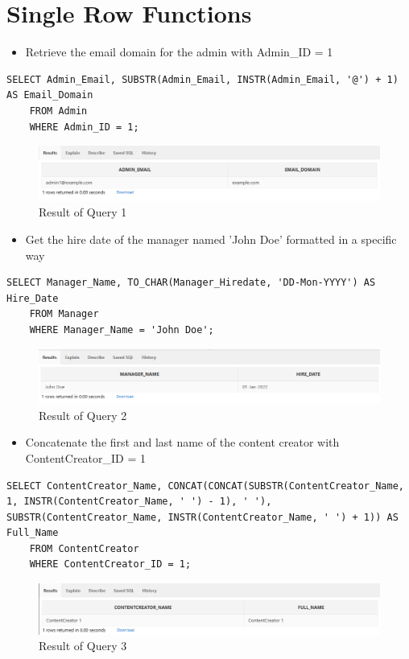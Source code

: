 \section[Single Row Functions]{Single Row Functions}
\hrulefill
\begin{itemize}
    \item Retrieve the email domain for the admin with Admin\_ID = 1
\end{itemize}

\begin{lstlisting}[caption={ Query 1},label={lst:q-1}]
    SELECT Admin_Email, SUBSTR(Admin_Email, INSTR(Admin_Email, '@') + 1) AS Email_Domain
    FROM Admin
    WHERE Admin_ID = 1;
\end{lstlisting}

\begin{figure}[H]
    \centering
    \includegraphics[width=1\textwidth]{images/dml/Q1.png}
    \caption{Result of Query 1}
\end{figure}
\clearpage

\begin{itemize}
    \item Get the hire date of the manager named 'John Doe' formatted in a specific way
\end{itemize}
\begin{lstlisting}[caption={ Query 2},label={lst:q-2}]
    SELECT Manager_Name, TO_CHAR(Manager_Hiredate, 'DD-Mon-YYYY') AS Hire_Date
    FROM Manager
    WHERE Manager_Name = 'John Doe';
\end{lstlisting}

\begin{figure}[H]
    \centering
    \includegraphics[width=1\textwidth]{images/dml/Q2.png}
    \caption{Result of Query 2}
\end{figure}

\begin{itemize}
    \item Concatenate the first and last name of the content creator with ContentCreator\_ID = 1
\end{itemize}
\begin{lstlisting}[caption={ Query 3},label={lst:q-3}]
    SELECT ContentCreator_Name, CONCAT(CONCAT(SUBSTR(ContentCreator_Name, 1, INSTR(ContentCreator_Name, ' ') - 1), ' '), SUBSTR(ContentCreator_Name, INSTR(ContentCreator_Name, ' ') + 1)) AS Full_Name
    FROM ContentCreator
    WHERE ContentCreator_ID = 1;
\end{lstlisting}

\begin{figure}[H]
    \centering
    \includegraphics[width=1\textwidth]{images/dml/Q3.png}
    \caption{Result of Query 3}
\end{figure}
